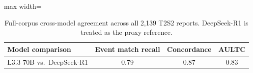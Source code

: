 \begin{table}[htbp]
\caption{Full-corpus cross-model agreement across all 2,139 T2S2 reports. DeepSeek-R1 is treated as the proxy reference.}
\ChSixTableBodyStart
\begin{ChSixFloatBody}

\centering
\small


\begin{adjustbox}{max width=\columnwidth}
\begin{tabular}{lccc}
\toprule
Model comparison & Event match recall & Concordance & AULTC \\
\midrule
L3.3 70B vs.\ DeepSeek-R1 & 0.79 & 0.87 & 0.83 \\
\bottomrule
\end{tabular}
\end{adjustbox}

\end{ChSixFloatBody}
\end{table}
